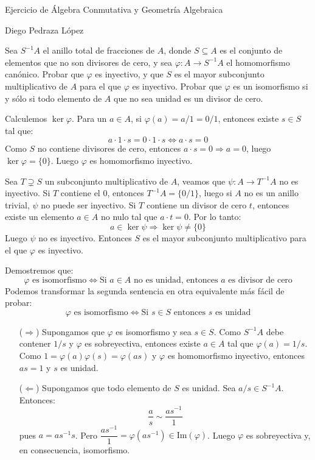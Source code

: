 \documentclass{article}
\begin{document}
\begin{center}
\large Ejercicio de Álgebra Conmutativa y Geometría Algebraica

\normalsize Diego Pedraza López
\end{center}

\begin{ejercicio}{8}
Sea $S^{-1}A$ el anillo total de fracciones de $A$, donde $S \subseteq A$ es el conjunto de elementos que no son divisores de cero, y sea $φ : A \to S^{-1}A$ el homomorfismo canónico. Probar que $φ$ es inyectivo, y que $S$ es el mayor subconjunto multiplicativo de $A$ para el que $φ$ es inyectivo. Probar que $φ$ es un isomorfismo si y sólo si todo elemento de $A$ que no sea unidad es un divisor de cero.
\end{ejercicio}

\begin{sol}
Calculemos $\ker φ$. Para un $a \in A$, si $φ(a)=a/1=0/1$, entonces existe $s \in S$ tal que:
\[ a \cdot 1 \cdot s = 0 \cdot 1 \cdot s  \Leftrightarrow a \cdot s = 0 \]
Como $S$ no contiene divisores de cero, entonces $a \cdot s = 0 \Rightarrow a = 0$, luego $\ker φ = \{0\}$. Luego $φ$ es homomorfismo inyectivo.

Sea $T \supsetneq S$ un subconjunto multiplicativo de $A$, veamos que $ψ : A \to T^{-1}A$ no es inyectivo. Si $T$ contiene el $0$, entonces $T^{-1}A=\{0/1\}$, luego si $A$ no es un anillo trivial, $ψ$ no puede ser inyectivo. Si $T$ contiene un divisor de cero $t$, entonces existe un elemento $a \in A$ no nulo tal que $a\cdot t = 0$. Por lo tanto:
\[ a \in \ker ψ \Rightarrow \ker ψ \neq \{0\} \]
Luego $ψ$ no es inyectivo. Entonces $S$ es el mayor subconjunto multiplicativo para el que $φ$ es inyectivo.

Demostremos que:
\[ φ \text{ es isomorfismo} \Leftrightarrow \text{Si }a \in A \text{ no es unidad, entonces }a\text{ es divisor de cero} \]
Podemos transformar la segunda sentencia en otra equivalente más fácil de probar:
\[ φ \text{ es isomorfismo} \Leftrightarrow \text{Si }s \in S \text{ entonces }s\text{ es unidad} \]
\begin{itemize}
	\item[($\Rightarrow$)] Supongamos que $φ$ es isomorfismo y sea $s \in S$. Como $S^{-1}A$ debe contener $1/s$ y $φ$ es sobreyectiva, entonces existe $a \in A$ tal que $φ(a)=1/s$. Como $1=φ(a)φ(s)=φ(as)$ y $φ$ es homomorfismo inyectivo, entonces $as=1$ y $s$ es unidad.
	
	\item[($\Leftarrow$)] Supongamos que todo elemento de $S$ es unidad. Sea $a/s \in S^{-1}A$. Entonces:
	\[ \frac{a}{s} \sim \frac{as^{-1}}{1} \]
	pues $a=as^{-1}s$. Pero $\dfrac{as^{-1}}{1}=φ(as^{-1}) \in \text{Im}(φ)$. Luego $φ$ es sobreyectiva y, en consecuencia, isomorfismo.
\end{itemize}
\end{sol}
\end{document}
